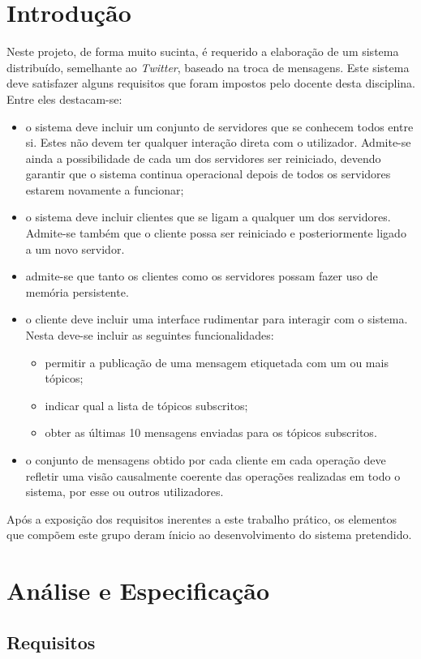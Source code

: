 \documentclass[a4paper]{report}
\begin{document}
\chapter{Introdução} \label{intro}
\large{
	Neste projeto, de forma muito sucinta, é requerido a elaboração de um sistema distribuído, semelhante ao \textit{Twitter}, baseado na troca de mensagens. Este sistema deve satisfazer alguns requisitos que foram impostos pelo docente desta disciplina. Entre eles destacam-se:
	\begin{itemize}
		\item o sistema deve incluir um conjunto de servidores que se conhecem todos entre si. Estes não devem ter qualquer interação direta com o utilizador. Admite-se ainda a possibilidade de cada um dos servidores ser reiniciado, devendo garantir que o sistema continua operacional depois de todos os servidores estarem novamente a funcionar;
		\item o sistema deve incluir clientes que se ligam a qualquer um dos servidores. Admite-se também que o cliente possa ser reiniciado e posteriormente ligado a um novo servidor.
		\item admite-se que tanto os clientes como os servidores possam fazer uso de memória persistente.
		\item o cliente deve incluir uma interface rudimentar para interagir com o sistema. Nesta deve-se incluir as seguintes funcionalidades:
		\begin{itemize}
			\item permitir a publicação de uma mensagem etiquetada com um ou mais tópicos;
			\item indicar qual a lista de tópicos subscritos;
			\item obter as últimas 10 mensagens enviadas para os tópicos subscritos.
		\end{itemize}
		\item o conjunto de mensagens obtido por cada cliente em cada operação deve refletir uma visão causalmente coerente das operações realizadas em todo o sistema, por esse ou outros utilizadores.
	\end{itemize}
	Após a exposição dos requisitos inerentes a este trabalho prático, os elementos que compõem este grupo deram ínicio ao desenvolvimento do sistema pretendido.
}

\chapter{Análise e Especificação}
    \section{Requisitos}
\end{document}
